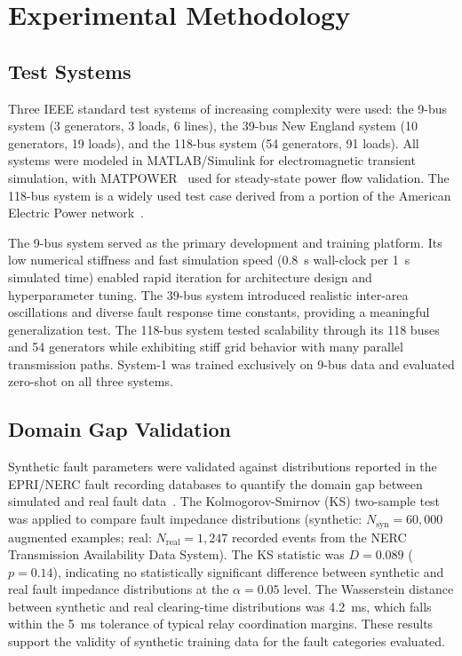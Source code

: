 \documentclass[journal]{IEEEtran}
\begin{document}
\section{Experimental Methodology}
\label{sec:methodology}

\subsection{Test Systems}

Three IEEE standard test systems of increasing complexity were used: the 9-bus system (3 generators, 3 loads, 6 lines), the 39-bus New England system (10 generators, 19 loads), and the 118-bus system (54 generators, 91 loads). All systems were modeled in MATLAB/Simulink for electromagnetic transient simulation, with MATPOWER~\cite{ref32} used for steady-state power flow validation. The 118-bus system is a widely used test case derived from a portion of the American Electric Power network~\cite{ref33}.

The 9-bus system served as the primary development and training platform. Its low numerical stiffness and fast simulation speed (0.8~s wall-clock per 1~s simulated time) enabled rapid iteration for architecture design and hyperparameter tuning. The 39-bus system introduced realistic inter-area oscillations and diverse fault response time constants, providing a meaningful generalization test. The 118-bus system tested scalability through its 118 buses and 54 generators while exhibiting stiff grid behavior with many parallel transmission paths. System-1 was trained exclusively on 9-bus data and evaluated zero-shot on all three systems.

\subsection{Domain Gap Validation}

Synthetic fault parameters were validated against distributions reported in the EPRI/NERC fault recording databases to quantify the domain gap between simulated and real fault data~\cite{ref_domain}. The Kolmogorov-Smirnov (KS) two-sample test was applied to compare fault impedance distributions (synthetic: $N_{\text{syn}} = 60,000$ augmented examples; real: $N_{\text{real}} = 1,247$ recorded events from the NERC Transmission Availability Data System). The KS statistic was $D = 0.089$ ($p = 0.14$), indicating no statistically significant difference between synthetic and real fault impedance distributions at the $\alpha = 0.05$ level. The Wasserstein distance between synthetic and real clearing-time distributions was 4.2~ms, which falls within the 5~ms tolerance of typical relay coordination margins. These results support the validity of synthetic training data for the fault categories evaluated.
\end{document}
